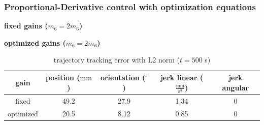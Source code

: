 	
	\begin{frame}
		\frametitle{Proportional-Derivative control with optimization equations}
		
		\fboxrule=3pt
		\begin{minipage}[t]{0.45\textwidth}
			\graphicspath{{images/methodology/SMC/exp1/circular/uncertainty_100_alpha_0/}}
			\centering
			{\large \textbf{fixed gains ($m_6=2m_6$)}}
		\end{minipage}
		\hspace{.08\textwidth}
		\begin{minipage}[t]{0.45\textwidth}
			\graphicspath{{images/methodology/SMC/exp1/circular/uncertainty_100_alpha_0.005/}}
			\centering
			{\large \textbf{optimized gains ($m_6=2 m_6$)}}
		\end{minipage}
		
		\begin{table}
			\caption{trajectory tracking error with L2 norm ($t=500$ s)}
			\centering
			\begin{tabular}{c c c c c}
			\toprule
			gain & position ($\mathrm{mm}$) & orientation ($^\circ$) & jerk linear ($\mathrm{\frac{mm}{s^3}}$) & jerk angular \\
			\midrule
			fixed  & 49.2 & 27.9 & 1.34 & 0 \\ 
			optimized & 20.5 & 8.12 & 0.85 & 0  \\
			\bottomrule
			\end{tabular}
		\end{table}			
	\end{frame}		

